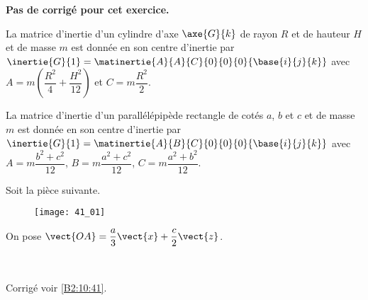 \normaltrue \difficilefalse \tdifficilefalse
\correctionfalse


\setcounter{numques}{0}
\ifcorrection
\else
\textbf{Pas de corrigé pour cet exercice.}
\fi

\ifprof
\else
La matrice d'inertie d'un cylindre d'axe $\axe{G}{k}$ de rayon $R$ et de hauteur $H$ et de masse $m$ est donnée en son centre d'inertie par 
$\inertie{G}{1}=\matinertie{A}{A}{C}{0}{0}{0}{\base{i}{j}{k}}$ avec $A=m\left(\dfrac{R^2}{4}+\dfrac{H^2}{12} \right)$ et $C=m\dfrac{R^2}{2}$. 


La matrice d'inertie d'un parallélépipède rectangle de cotés $a$, $b$ et $c$ et de masse $m$ est donnée en son centre d'inertie par 
$\inertie{G}{1}=\matinertie{A}{B}{C}{0}{0}{0}{\base{i}{j}{k}}$ avec $A={m\dfrac{b^2+c^2}{12}}$, $B={m\dfrac{a^2+c^2}{12}}$, $C={m\dfrac{a^2+b^2}{12}}$.

Soit la pièce suivante. 
\begin{figure}[H]
\centering
\texttt{[image: 41\_01]}
\end{figure}

On pose $\vect{OA}=\dfrac{a}{3}\vect{x}+\dfrac{c}{2}\vect{z}$. 

\fi



\ifprof
\else
\fi

\ifprof ~\\
\else
\fi


\ifprof
\else
\begin{flushright}
\footnotesize{Corrigé voir \ref{B2:10:41}.}
\end{flushright}%
\fi